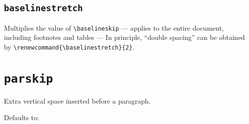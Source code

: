 \documentclass{article}
\begin{document}
\setlength{\baselineskip}{\defaultbaselineskip}


\subsection{\texttt{baselinestretch}}
Multiplies the value of \verb|\baselineskip| --- applies to the entire document, including footnotes and tables ---
In principle, ``double spacing'' can be obtained by \verb|\renewcommand{\baselinestretch}{2}|.
\newpage

\section{\texttt{parskip}}
Extra vertical space inserted before a paragraph.

\let\defaultparskip\parskip
Defaults to: \the\defaultparskip

\blindtext[1]

\setlength{\parskip}{16pt}
\blindtext[1]

\setlength{\parskip}{32pt}
\blindtext[1]

\setlength{\parskip}{\defaultparskip}
\end{document}
